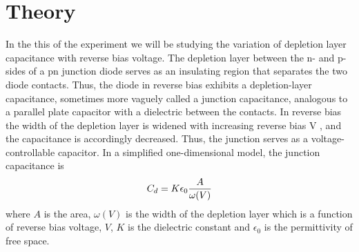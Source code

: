 	\section{Theory}
	In the this of the experiment we will be studying the variation of depletion layer capacitance with reverse bias voltage. The depletion layer between the n- and p-sides of a pn junction diode serves as an insulating region that separates the two diode contacts. Thus, the diode in reverse bias exhibits a depletion-layer capacitance, sometimes more vaguely called a junction capacitance, analogous to a parallel plate capacitor with a dielectric between the contacts. In reverse bias the width of the depletion layer is widened with increasing reverse bias V , and the capacitance is accordingly decreased. Thus, the junction serves as a voltage-controllable capacitor. In a simplified one-dimensional model, the junction capacitance is
	\begin{equation}{\label{eqn:Cd}}
		C_d = K\epsilon_0 \dfrac{A}{\omega(V)}
	\end{equation}
	where $ A $ is the area, $ \omega (V) $ is the width of the depletion layer which is a function of reverse bias voltage, $ V $, $ K $ is the dielectric constant and $ \epsilon_0 $ is the permittivity of free space. 
	
